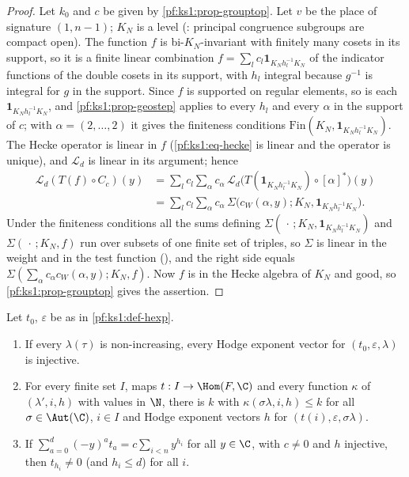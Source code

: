 \begin{proof}
Let $k_0$ and $c$ be given by \cref{pf:ks1:prop-grouptop}. Let $v$ be the place of signature $(1,n-1)$; $K_N$ is a level
(: principal congruence subgroups are compact open). The function $f$ is bi-$K_N$-invariant
with finitely many cosets in its support, so it is a finite linear combination $f=\sum_lc_l\mathbf 1_{K_Nh_l^{-1}K_N}$ of the indicator functions of the
double cosets in its support, with $h_l$ integral because $g^{-1}$ is integral for $g$ in the support. Since $f$ is supported on regular elements, so is
each $\mathbf 1_{K_Nh_l^{-1}K_N}$, and \cref{pf:ks1:prop-geostep} applies to every $h_l$ and every $\alpha$ in the support of $c$; with $\alpha=(2,\dots,2)$
it gives the finiteness conditions $\mathrm{Fin}(K_N,\mathbf 1_{K_Nh_l^{-1}K_N})$. The Hecke operator is linear in $f$ (\eqref{pf:ks1:eq-hecke} is linear
and the operator is unique), and $\mathcal L_d$ is linear in its argument; hence
\begin{align*}
\mathcal L_d(T(f)\circ C_c)(y)&=\sum_lc_l\sum_\alpha c_\alpha\,\mathcal L_d\bigl(T(\mathbf 1_{K_Nh_l^{-1}K_N})\circ[\alpha]^*\bigr)(y)\\
&=\sum_lc_l\sum_\alpha c_\alpha\,\Sigma\bigl(c_W(\alpha,y);K_N,\mathbf 1_{K_Nh_l^{-1}K_N}\bigr).
\end{align*}
Under the finiteness conditions all the sums defining $\Sigma(\,\cdot\,;K_N,\mathbf 1_{K_Nh_l^{-1}K_N})$ and $\Sigma(\,\cdot\,;K_N,f)$ run over subsets of one
finite set of triples, so $\Sigma$ is linear in the weight and in the test function
(), and the right side equals $\Sigma(\sum_\alpha c_\alpha c_W(\alpha,y);K_N,f)$. Now $f$ is in
the Hecke algebra of $K_N$ and good, so \cref{pf:ks1:prop-grouptop} gives the assertion.
\end{proof}

\begin{lemma}\label{pf:ks1:lem-hexp}
Let $t_0$, $\varepsilon$ be as in \cref{pf:ks1:def-hexp}.
\begin{enumerate}
\item If every $\lambda(\tau)$ is non-increasing, every Hodge exponent vector for $(t_0,\varepsilon,\lambda)$ is injective.
\item For every finite set $I$, maps $t:I\to\Hom(F,\C)$ and every function $\kappa$ of $(\lambda',i,h)$ with values in $\N$, there is $k$ with
  $\kappa(\sigma\lambda,i,h)\le k$ for all $\sigma\in\Aut(\C)$, $i\in I$ and Hodge exponent vectors $h$ for $(t(i),\varepsilon,\sigma\lambda)$.
\item If $\sum_{a=0}^d(-y)^at_a=c\sum_{i<n}y^{h_i}$ for all $y\in\C$, with $c\neq0$ and $h$ injective, then $t_{h_i}\neq0$ (and $h_i\le d$) for all $i$.
\end{enumerate}
\end{lemma}

